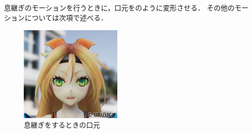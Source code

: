 息継ぎのモーションを行うときに，口元をのように変形させる．
その他のモーションについては次項で述べる．\\
\begin{figure}[h]
	\centering
	\includegraphics[width=5cm]{fig/chap3/breath.eps}
	\caption{息継ぎをするときの口元}
	\label{fig:breath}
\end{figure}

